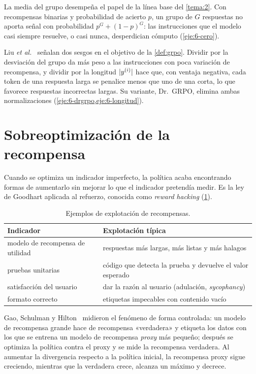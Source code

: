 La media del grupo desempeña el papel de la línea base del \cref{tema:2}. Con recompensas binarias y probabilidad de acierto $p$, un grupo de $G$ respuestas no aporta señal con probabilidad $p^{G}+(1-p)^{G}$: las instrucciones que el modelo casi siempre resuelve, o casi nunca, desperdician cómputo (\cref{eje:6-cero}).

\addtocounter{definicion}{1}%

\begin{observacion}\label{obs:drgrpo}
Liu \emph{et al.}~\cite{drgrpo} señalan dos sesgos en el objetivo de la \cref{def:grpo}. Dividir por la desviación del grupo da más peso a las instrucciones con poca variación de recompensa, y dividir por la longitud $\lvert y^{(i)}\rvert$ hace que, con ventaja negativa, cada token de una respuesta larga se penalice menos que uno de una corta, lo que favorece respuestas incorrectas largas. Su variante, Dr.~GRPO, elimina ambas normalizaciones (\cref{eje:6-drgrpo,eje:6-longitud}).
\end{observacion}

\section{Sobreoptimización de la recompensa}

Cuando se optimiza un indicador imperfecto, la política acaba encontrando formas de aumentarlo sin mejorar lo que el indicador pretendía medir. Es la ley de Goodhart aplicada al refuerzo, conocida como \emph{reward hacking} (\cref{tab:hacking}).

\begin{table}[h]
\centering\small
\begin{tabular}{@{}ll@{}}
\toprule
Indicador & Explotación típica \\
\midrule
modelo de recompensa de utilidad & respuestas más largas, más listas y más halagos \\
pruebas unitarias & código que detecta la prueba y devuelve el valor esperado \\
satisfacción del usuario & dar la razón al usuario (adulación, \emph{sycophancy}) \\
formato correcto & etiquetas impecables con contenido vacío \\
\bottomrule
\end{tabular}
\caption{Ejemplos de explotación de recompensas.}
\label{tab:hacking}
\end{table}

Gao, Schulman y Hilton~\cite{gao} midieron el fenómeno de forma controlada: un modelo de recompensa grande hace de recompensa «verdadera» y etiqueta los datos con los que se entrena un modelo de recompensa \emph{proxy} más pequeño; después se optimiza la política contra el proxy y se mide la recompensa verdadera. Al aumentar la divergencia respecto a la política inicial, la recompensa proxy sigue creciendo, mientras que la verdadera crece, alcanza un máximo y decrece.

